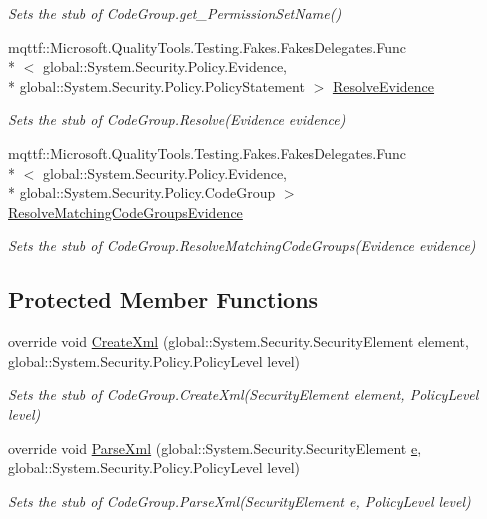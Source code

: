 \begin{DoxyCompactItemize}
\begin{DoxyCompactList}\small\item\em Sets the stub of Code\-Group.\-get\-\_\-\-Permission\-Set\-Name()\end{DoxyCompactList}\item 
mqttf\-::\-Microsoft.\-Quality\-Tools.\-Testing.\-Fakes.\-Fakes\-Delegates.\-Func\\*
$<$ global\-::\-System.\-Security.\-Policy.\-Evidence, \\*
global\-::\-System.\-Security.\-Policy.\-Policy\-Statement $>$ \hyperlink{class_system_1_1_security_1_1_policy_1_1_fakes_1_1_stub_code_group_a908d054966244c2752028dc1ef2b4c85}{Resolve\-Evidence}
\begin{DoxyCompactList}\small\item\em Sets the stub of Code\-Group.\-Resolve(\-Evidence evidence)\end{DoxyCompactList}\item 
mqttf\-::\-Microsoft.\-Quality\-Tools.\-Testing.\-Fakes.\-Fakes\-Delegates.\-Func\\*
$<$ global\-::\-System.\-Security.\-Policy.\-Evidence, \\*
global\-::\-System.\-Security.\-Policy.\-Code\-Group $>$ \hyperlink{class_system_1_1_security_1_1_policy_1_1_fakes_1_1_stub_code_group_aeaf23967955397188ae21123fca4062c}{Resolve\-Matching\-Code\-Groups\-Evidence}
\begin{DoxyCompactList}\small\item\em Sets the stub of Code\-Group.\-Resolve\-Matching\-Code\-Groups(\-Evidence evidence)\end{DoxyCompactList}\end{DoxyCompactItemize}
\subsection*{Protected Member Functions}
\begin{DoxyCompactItemize}
\item 
override void \hyperlink{class_system_1_1_security_1_1_policy_1_1_fakes_1_1_stub_code_group_ab3574522de21b7dd051e38d427212112}{Create\-Xml} (global\-::\-System.\-Security.\-Security\-Element element, global\-::\-System.\-Security.\-Policy.\-Policy\-Level level)
\begin{DoxyCompactList}\small\item\em Sets the stub of Code\-Group.\-Create\-Xml(\-Security\-Element element, Policy\-Level level)\end{DoxyCompactList}\item 
override void \hyperlink{class_system_1_1_security_1_1_policy_1_1_fakes_1_1_stub_code_group_ab53912a04fd440c0032dde040020c54d}{Parse\-Xml} (global\-::\-System.\-Security.\-Security\-Element \hyperlink{jquery-1_810_82_8min_8js_a2c038346d47955cbe2cb91e338edd7e1}{e}, global\-::\-System.\-Security.\-Policy.\-Policy\-Level level)
\begin{DoxyCompactList}\small\item\em Sets the stub of Code\-Group.\-Parse\-Xml(\-Security\-Element e, Policy\-Level level)\end{DoxyCompactList}\end{DoxyCompactItemize}
